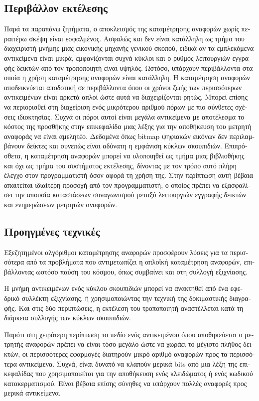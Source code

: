 \begin{greek}
\subsection{Περιβάλλον εκτέλεσης}
Παρά τα παραπάνω ζητήματα, ο αποκλεισμός της καταμέτρησης
αναφορών χωρίς περαιτέρω σκέψη είναι εσφαλμένος. Ασφαλώς
και δεν είναι κατάλληλη ως τμήμα του διαχειριστή μνήμης
μιας εικονικής μηχανής γενικού σκοπού, ειδικά αν τα
εμπλεκόμενα αντικείμενα είναι μικρά, εμφανίζονται συχνά
κύκλοι και ο ρυθμός λειτουργιών εγγραφής δεικτών από τον
τροποποιητή είναι υψηλός. Ωστόσο, υπάρχουν περιβάλλοντα
στα οποία η χρήση καταμέτρησης αναφορών είναι κατάλληλη.
Η καταμέτρηση αναφορών αποδεικνύεται αποδοτική σε
περιβάλλοντα όπου οι χρόνοι ζωής των περισσότερων
αντικειμένων είναι αρκετά απλοί ώστε αυτά να διαχειρίζονται
ρητώς. Μπορεί επίσης να περιορισθεί στη διαχείριση ενός
μικρότερου αριθμού πόρων με πιο σύνθετες σχέσεις
ιδιοκτησίας. Συχνά οι πόροι αυτοί είναι μεγάλα αντικείμενα
με αποτέλεσμα το κόστος της προσθήκης στην επικεφαλίδα μιας
λέξης για την αποθήκευση του μετρητή αναφοράς να είναι
αμελητέο. Δεδομένα όπως bitmap ψηφιακών εικόνων δεν
περιλαμβάνουν δείκτες και συνεπώς είναι αδύνατη η εμφάνιση
κύκλων σκουπιδιών. Επιπρόσθετα, η καταμέτρηση αναφορών
μπορεί να υλοποιηθεί ως τμήμα μιας βιβλιοθήκης και όχι
ως τμήμα του συστήματος εκτέλεσης, δίνοντας με τον τρόπο
αυτό πλήρη έλεγχο στον προγραμματιστή όσον αφορά τη χρήση
της. Στην περίπτωση αυτή βέβαια απαιτείται ιδιαίτερη
προσοχή από τον προγραμματιστή, ο οποίος πρέπει να
εξασφαλίσει την απουσία καταστάσεων συναγωνισμού μεταξύ
λειτουργιών εγγραφής δεικτών και ενημερώσεων μετρητών
αναφορών.

\subsection{Προηγμένες τεχνικές}
Εξεζητημένοι αλγόριθμοι καταμέτρησης αναφορών προσφέρουν
λύσεις για τα περισσότερα από τα προβλήματα που αντιμετωπίζει
η απλοϊκή καταμέτρηση αναφορών, επιβάλλοντας ωστόσο παύση
του κόσμου, όπως συμβαίνει και στη συλλογή εξιχνίασης.

Η μνήμη αντικειμένων ενός κύκλου σκουπιδιών μπορεί να ανακτηθεί
από ένα εφεδρικό συλλέκτη εξιχνίασης, ή χρησιμοποιώντας την
τεχνική της δοκιμαστικής διαγραφής. Και στις δύο περιπτώσεις,
η εκτέλεση του τροποποιητή αναστέλλεται κατά τη διάρκεια
συλλογής των κύκλων σκουπιδιών.

Παρότι στη χειρότερη περίπτωση το πεδίο ενός αντικειμένου
όπου αποθηκεύεται ο μετρητής αναφορών πρέπει να είναι τόσο
μεγάλο ώστε να χωράει το μέγιστο πλήθος δεικτών, οι
περισσότερες εφαρμογές διατηρούν μικρό αριθμό αναφορών προς
τα περισσότερα αντικείμενα. Συχνά, είναι δυνατό να κλαπούν
μερικά bits από μια λέξη της επικεφαλίδας που χρησιμοποιείται
για την αποθήκευση ενός κλειδώματος ή ενός κωδικού
κατακερματισμού. Είναι βέβαια επίσης σύνηθες να υπάρχουν
πολλές αναφορές προς μερικά αντικείμενα.


\end{greek}
